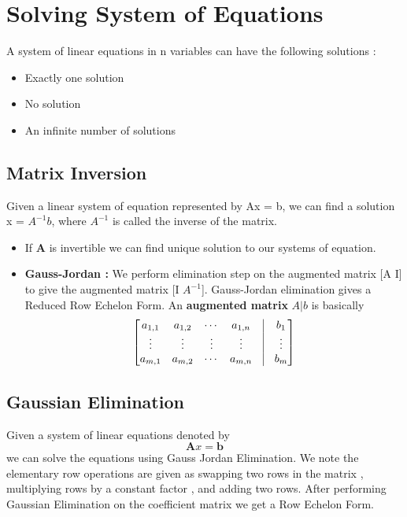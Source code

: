 \documentclass[12pt]{article}
\begin{document}
\section{Solving System of Equations}
A system of linear equations in n variables can have the following solutions :
\begin{itemize}
    \setlength\itemsep{0.0125em}
    \item Exactly one solution
    \item No solution
    \item An infinite number of solutions
\end{itemize}

\subsection{Matrix Inversion}
Given a linear system of equation represented by Ax = b, we can find a solution x = $A^{-1}b$, where $A^{-1}$ is called the inverse of the matrix.
\begin{itemize}
    \item If  $\mathbf{A}$ is invertible we can find unique solution to our systems of equation. 
    \item \textbf{Gauss-Jordan : } We perform elimination step on the augmented matrix [A I] to give the augmented matrix [I $A^{-1}$]. Gauss-Jordan elimination gives a Reduced Row Echelon Form.
    An \textbf{augmented matrix} $A|b$ is basically
    \begin{equation*}
    \begin{bmatrix}
    	a_{1, 1} & a_{1, 2} & \cdots & a_{1, n} & \vline & b_1\\
    	\vdots & \vdots & \vdots & \vdots & \vline & \vdots\\
    	a_{m, 1} & a_{m, 2} & \cdots & a_{m, n} & \vline & b_m \\
    \end{bmatrix}
    \end{equation*}
\end{itemize}



\subsection{Gaussian Elimination}
Given a system of linear equations denoted by
$$
\mathbf{A} x = \mathbf{b}
$$
we can solve the equations using Gauss Jordan Elimination. We note the elementary row operations are given as swapping two rows in the matrix , multiplying rows by a constant factor , and adding two rows. After performing Gaussian Elimination on the coefficient matrix we get a Row Echelon Form.
\end{document}
